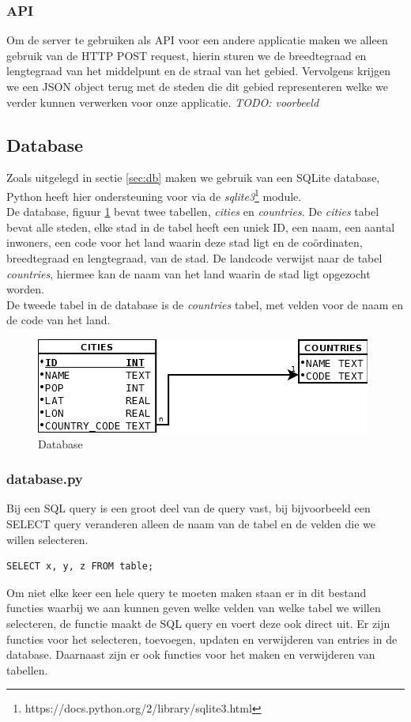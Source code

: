 \documentclass[twoside,openright]{uva-bachelor-thesis}
\begin{document}
		\subsubsection{API}
		Om de server te gebruiken als API voor een andere applicatie maken we alleen gebruik van de HTTP POST request, hierin sturen we de breedtegraad en lengtegraad van het middelpunt en de straal van het gebied. Vervolgens krijgen we een JSON object terug met de steden die dit gebied representeren welke we verder kunnen verwerken voor onze applicatie.
		\textit{TODO: voorbeeld}
		\subsection{Database}
			Zoals uitgelegd in sectie \ref{sec:db} maken we gebruik van een SQLite database, Python heeft hier ondersteuning voor via de \textit{sqlite3}\footnote{https://docs.python.org/2/library/sqlite3.html} module.\\[0.5cm]
			De database, figuur \ref{fig:db} bevat twee tabellen, \textit{cities} en \textit{countries}. De \textit{cities} tabel bevat alle steden, elke stad in de tabel heeft een uniek ID, een naam, een aantal inwoners, een code voor het land waarin deze stad ligt en de co\"ordinaten, breedtegraad en lengtegraad, van de stad. De landcode verwijst naar de tabel \textit{countries}, hiermee kan de naam van het land waarin de stad ligt opgezocht worden. \\[0.5cm]
			De tweede tabel in de database is de \textit{countries} tabel,  met velden voor de naam en de code van het land.
			\begin{figure}[!htb]
				\label{fig:db}
				\centering
				\includegraphics[scale=0.6]{./img/database.png}
				\caption{Database}
			\end{figure}
			\subsubsection{database.py}
			Bij een SQL query is een groot deel van de query vast, bij bijvoorbeeld een SELECT query veranderen alleen de naam van de tabel en de velden die we willen selecteren.
\begin{verbatim}
SELECT x, y, z FROM table;
\end{verbatim}
			Om niet elke keer een hele query te moeten maken staan er in dit bestand functies waarbij we aan kunnen geven welke velden van welke tabel we willen selecteren, de functie maakt de SQL query en voert deze ook direct uit. Er zijn functies voor het selecteren, toevoegen, updaten en verwijderen van entries in de database. Daarnaast zijn er ook functies voor het maken en verwijderen van tabellen.
\end{document}
